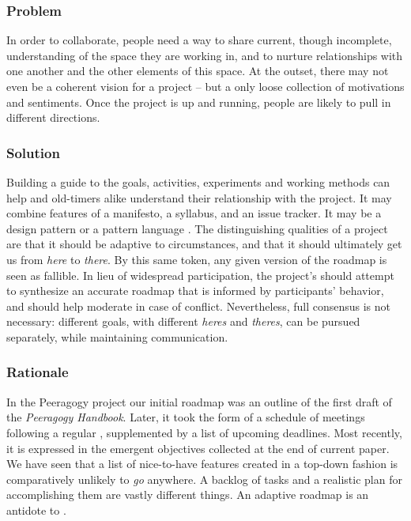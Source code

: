 \subsubsection*{Problem} In order to collaborate, people need a way to share current, though incomplete, understanding of the space they are working in, and to nurture relationships with one another and the other elements of this space.  At the outset, there may not even be a coherent vision for a project -- but a only loose collection of motivations and sentiments.  Once the project is up and running, people are likely to pull in different directions.   

\subsubsection*{Solution}  Building a guide to the goals, activities, experiments and working methods can help  and old-timers alike understand their relationship with the project.
It may combine features of a manifesto, a syllabus, and an issue tracker.  It may be a design pattern or a pattern language \cite{kohls2010structure}.  The distinguishing qualities of a project  are that it should be adaptive to circumstances, and that it should ultimately get us from \emph{here} to \emph{there}.  By this same token, any given version of the roadmap is seen as fallible.  %
In lieu of widespread participation, the project's  should attempt to synthesize an accurate roadmap that is informed by participants' behavior, and should help moderate in case of conflict.  Nevertheless, full consensus is not necessary: different goals, with different \emph{heres} and \emph{theres}, can be pursued separately, while maintaining communication.

\subsubsection*{Rationale} 
In the Peeragogy project our initial roadmap was an outline of the
first draft of the \emph{Peeragogy Handbook}.  Later, it took the form
of a schedule of meetings following a regular
, supplemented by a list of upcoming
deadlines.  Most recently, it is expressed in the emergent objectives
collected at the end of current paper.  We have seen that a list of
nice-to-have features created in a top-down fashion is comparatively
unlikely to \emph{go} anywhere.  A backlog of tasks and a realistic
plan for accomplishing them are vastly different things.  An adaptive
roadmap is an antidote to 
\cite[pp. 121--124]{david2001software}.


